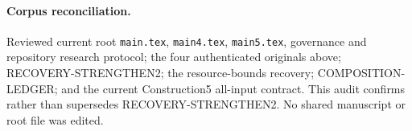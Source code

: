 \documentclass[11pt]{article}
\begin{document}
\paragraph{Corpus reconciliation.}
Reviewed current root \nolinkurl{main.tex}, \nolinkurl{main4.tex},
\nolinkurl{main5.tex}, governance and repository research protocol; the four
authenticated originals above; RECOVERY-STRENGTHEN2; the resource-bounds
recovery; COMPOSITION-LEDGER; and the current Construction5 all-input
contract.  This audit confirms rather than supersedes RECOVERY-STRENGTHEN2.
No shared manuscript or root file was edited.

\end{document}
